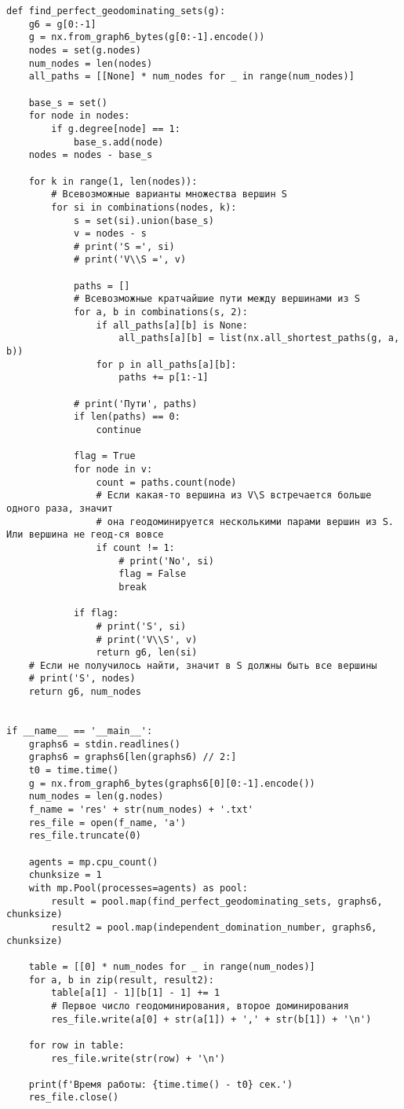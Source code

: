 \documentclass[bachelor, och, nir]{SCWorks}
\begin{document}
\begin{verbatim}
def find_perfect_geodominating_sets(g):
    g6 = g[0:-1]
    g = nx.from_graph6_bytes(g[0:-1].encode())
    nodes = set(g.nodes)
    num_nodes = len(nodes)
    all_paths = [[None] * num_nodes for _ in range(num_nodes)]

    base_s = set()
    for node in nodes:
        if g.degree[node] == 1:
            base_s.add(node)
    nodes = nodes - base_s

    for k in range(1, len(nodes)):
        # Всевозможные варианты множества вершин S
        for si in combinations(nodes, k):
            s = set(si).union(base_s)
            v = nodes - s
            # print('S =', si)
            # print('V\\S =', v)

            paths = []
            # Всевозможные кратчайшие пути между вершинами из S
            for a, b in combinations(s, 2):
                if all_paths[a][b] is None:
                    all_paths[a][b] = list(nx.all_shortest_paths(g, a, b))
                for p in all_paths[a][b]:
                    paths += p[1:-1]

            # print('Пути', paths)
            if len(paths) == 0:
                continue

            flag = True
            for node in v:
                count = paths.count(node)
                # Если какая-то вершина из V\S встречается больше одного раза, значит
                # она геодоминируется несколькими парами вершин из S. Или вершина не геод-ся вовсе
                if count != 1:
                    # print('No', si)
                    flag = False
                    break

            if flag:
                # print('S', si)
                # print('V\\S', v)
                return g6, len(si)
    # Если не получилось найти, значит в S должны быть все вершины
    # print('S', nodes)
    return g6, num_nodes


if __name__ == '__main__':
    graphs6 = stdin.readlines()
    graphs6 = graphs6[len(graphs6) // 2:]
    t0 = time.time()
    g = nx.from_graph6_bytes(graphs6[0][0:-1].encode())
    num_nodes = len(g.nodes)
    f_name = 'res' + str(num_nodes) + '.txt'
    res_file = open(f_name, 'a')
    res_file.truncate(0)

    agents = mp.cpu_count()
    chunksize = 1
    with mp.Pool(processes=agents) as pool:
        result = pool.map(find_perfect_geodominating_sets, graphs6, chunksize)
        result2 = pool.map(independent_domination_number, graphs6, chunksize)

    table = [[0] * num_nodes for _ in range(num_nodes)]
    for a, b in zip(result, result2):
        table[a[1] - 1][b[1] - 1] += 1
        # Первое число геодоминирования, второе доминирования
        res_file.write(a[0] + str(a[1]) + ',' + str(b[1]) + '\n')

    for row in table:
        res_file.write(str(row) + '\n')

    print(f'Время работы: {time.time() - t0} сек.')
    res_file.close()

    \end{verbatim}
\end{document}
